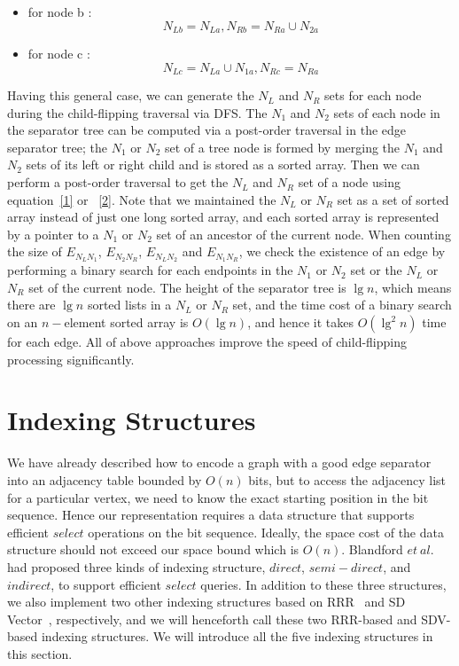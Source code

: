 \documentclass[12pt,glossary]{dalthesis}
\begin{document}
\begin{itemize}[noitemsep]
\item for node b : 
\begin{equation}
  \label{1}
    N_{Lb} = N_{La}, N_{Rb} = N_{Ra} \cup N_{2a}
\end{equation}
\item for node c : 
\begin{equation}
  \label{2}
     N_{Lc} = N_{La} \cup N_{1a}, N_{Rc} = N_{Ra} 
\end{equation}
\end{itemize}


Having this general case,  we can generate the $N_{L}$ and $N_{R}$ sets for each node during the child-flipping traversal via DFS. The $N_{1}$ and $N_{2}$ sets of each node in the separator tree can be computed via a post-order traversal in the edge separator tree; the $N_{1}$ or $N_{2}$ set of a tree node is formed by merging the $N_{1}$ and $N_{2}$ sets of its left or right child and is stored as a sorted array. Then we can perform a post-order traversal to get the $N_{L}$ and $N_{R}$ set of a node using equation~\eqref{1} or ~\eqref{2}. Note that we maintained the $N_{L}$ or $N_{R}$ set as a set of sorted array instead of just one long sorted array, and each sorted array is represented by a pointer to a $N_{1}$ or $N_{2}$ set of an ancestor of the current node. When counting the size of $E_{N_{L}N_{1}}$, $E_{N_{2}N_{R}}$, $E_{N_{L}N_{2}}$ and $E_{N_{1}N_{R}}$, we check the existence of an edge by performing a binary search for each endpoints in the $N_{1}$ or $N_{2}$ set or the $N_{L}$ or $N_{R}$ set of the current node. The height of the separator tree is $\lg n$, which means there are $\lg n$ sorted lists in a $N_{L}$ or $N_{R}$ set, and the time cost of a binary search on an $n-$element sorted array is $O(\lg n)$, and hence it takes $O(\lg ^{2} n)$ time for each edge. All of above approaches improve the speed of child-flipping processing significantly.

\section{Indexing Structures}

We have already described how to encode a graph with a good edge separator into an adjacency table bounded by $O(n)$ bits, but to access the adjacency list for a particular vertex, we need to know the exact starting position in the bit sequence. Hence our representation requires a data structure that supports efficient $select$ operations on the bit sequence. Ideally, the space cost of the data structure should not exceed our space bound which is $O(n)$. Blandford $et \ al.$~\cite{compact-representation} had proposed three kinds of indexing structure, $direct$, $semi-direct$, and $indirect$, to support efficient $select$ queries. In addition to these three structures, we also implement two other indexing structures based on RRR~\cite{RRR} and SD Vector~\cite{SD-vector}, respectively, and we will henceforth call these two RRR-based and SDV-based indexing structures. We will introduce all the five indexing structures in this section.
\end{document}
